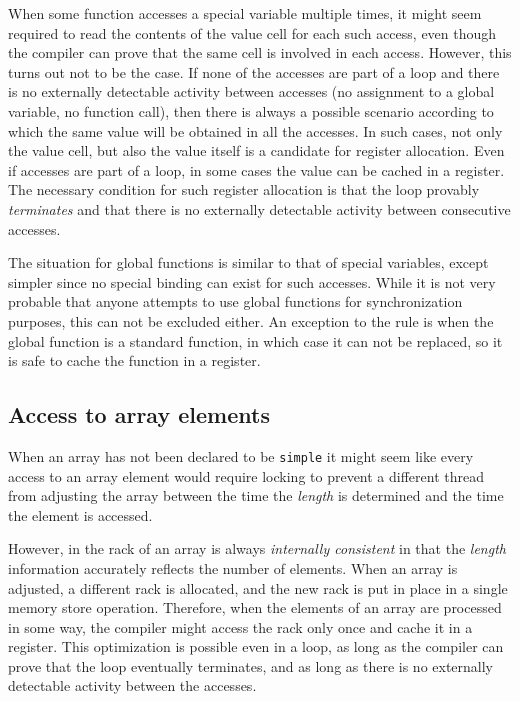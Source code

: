 When some function accesses a special variable multiple times, it
might seem required to read the contents of the value cell for each
such access, even though the compiler can prove that the same cell is
involved in each access.  However, this turns out not to be the case.
If none of the accesses are part of a loop and there is no externally
detectable activity between accesses (no assignment to a global
variable, no function call), then there is always a possible scenario
according to which the same value will be obtained in all the
accesses.  In such cases, not only the value cell, but also the value
itself is a candidate for register allocation.  Even if accesses are
part of a loop, in some cases the value can be cached in a register.
The necessary condition for such register allocation is that the loop
provably \emph{terminates} and that there is no externally detectable
activity between consecutive accesses. 

The situation for global functions is similar to that of special
variables, except simpler since no special binding can exist for such
accesses.  While it is not very probable that anyone attempts to use
global functions for synchronization purposes, this can not be
excluded either.  An exception to the rule is when the global function
is a standard \cl{} function, in which case it can not be replaced, so
it is safe to cache the function in a register. 

\subsection{Access to array elements}

When an array has not been declared to be \texttt{simple} it might
seem like every access to an array element would require locking to
prevent a different thread from adjusting the array between the time
the \emph{length} is determined and the time the element is accessed.

However, in \sysname{} the rack of an array is always
\emph{internally consistent} in that the \emph{length} information
accurately reflects the number of elements.  When an array is
adjusted, a different rack is allocated, and the new
rack is put in place in a single memory store operation.
Therefore, when the elements of an array are processed in some way,
the compiler might access the rack only once and cache it
in a register.  This optimization is possible even in a loop, as long
as the compiler can prove that the loop eventually terminates, and as
long as there is no externally detectable activity between the
accesses. 

